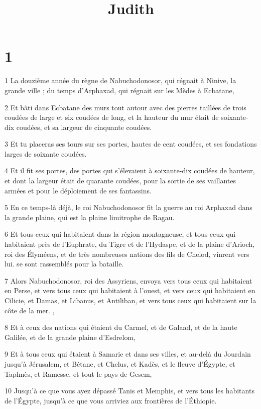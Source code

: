 

\title{Judith}


\chapter{1}

\par 1 La douzième année du règne de Nabuchodonosor, qui régnait à Ninive, la grande ville ; du temps d'Arphaxad, qui régnait sur les Mèdes à Ecbatane,
\par 2 Et bâti dans Ecbatane des murs tout autour avec des pierres taillées de trois coudées de large et six coudées de long, et la hauteur du mur était de soixante-dix coudées, et sa largeur de cinquante coudées.
\par 3 Et tu placeras ses tours sur ses portes, hautes de cent coudées, et ses fondations larges de soixante coudées.
\par 4 Et il fit ses portes, des portes qui s'élevaient à soixante-dix coudées de hauteur, et dont la largeur était de quarante coudées, pour la sortie de ses vaillantes armées et pour le déploiement de ses fantassins.
\par 5 En ce temps-là déjà, le roi Nabuchodonosor fit la guerre au roi Arphaxad dans la grande plaine, qui est la plaine limitrophe de Ragau.
\par 6 Et tous ceux qui habitaient dans la région montagneuse, et tous ceux qui habitaient près de l'Euphrate, du Tigre et de l'Hydaspe, et de la plaine d'Arioch, roi des Élyméens, et de très nombreuses nations des fils de Chelod, vinrent vers lui. se sont rassemblés pour la bataille.
\par 7 Alors Nabuchodonosor, roi des Assyriens, envoya vers tous ceux qui habitaient en Perse, et vers tous ceux qui habitaient à l'ouest, et vers ceux qui habitaient en Cilicie, et Damas, et Libanus, et Antiliban, et vers tous ceux qui habitaient sur la côte de la mer. ,
\par 8 Et à ceux des nations qui étaient du Carmel, et de Galaad, et de la haute Galilée, et de la grande plaine d'Esdrelom,
\par 9 Et à tous ceux qui étaient à Samarie et dans ses villes, et au-delà du Jourdain jusqu'à Jérusalem, et Bétane, et Chelus, et Kadès, et le fleuve d'Égypte, et Taphnès, et Ramesse, et tout le pays de Gesem,
\par 10 Jusqu'à ce que vous ayez dépassé Tanis et Memphis, et vers tous les habitants de l'Égypte, jusqu'à ce que vous arriviez aux frontières de l'Éthiopie.
